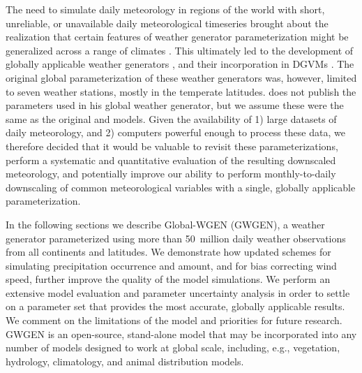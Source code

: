 \begin{refsection}
The need to simulate daily meteorology in regions of the world with short, unreliable, or unavailable daily meteorological timeseries brought about the realization that certain features of weather generator parameterization might be generalized across a range of climates \citep{GengAuburn1987,GengDevriesSupit1986}. This ultimately led to the development of globally applicable weather generators \citep{Friend1998}, and their incorporation in DGVMs \citep{BondeauSmithZaehleEtAl2007,GertenSchaphoffHaberlandtEtAl2004,PfeifferSpessaKaplan2013}. The original global parameterization \citep{GengDevriesSupit1986} of these weather generators was, however, limited to seven weather stations, mostly in the temperate latitudes. \cite{Friend1998} does not publish the parameters used in his global weather generator, but we assume these were the same as the original \cite{GengAuburn1987} and \cite{GengDevriesSupit1986} models. Given the availability of 1) large datasets of daily meteorology, and 2) computers powerful enough to process these data, we therefore decided that it would be valuable to revisit these parameterizations, perform a systematic and quantitative evaluation of the resulting downscaled meteorology, and potentially improve our ability to perform monthly-to-daily downscaling of common meteorological variables with a single, globally applicable parameterization.

In the following sections we describe Global-WGEN (GWGEN), a weather generator parameterized using more than 50~million daily weather observations from all continents and latitudes. We demonstrate how updated schemes for simulating precipitation occurrence and amount, and for bias correcting wind speed, further improve the quality of the model simulations. We perform an extensive model evaluation and parameter uncertainty analysis in order to settle on a parameter set that provides the most accurate, globally applicable results. We comment on the limitations of the model and priorities for future research. GWGEN is an open-source, stand-alone model that may be incorporated into any number of models designed to work at global scale, including, e.g., vegetation, hydrology, climatology, and animal distribution models.



\end{refsection}
